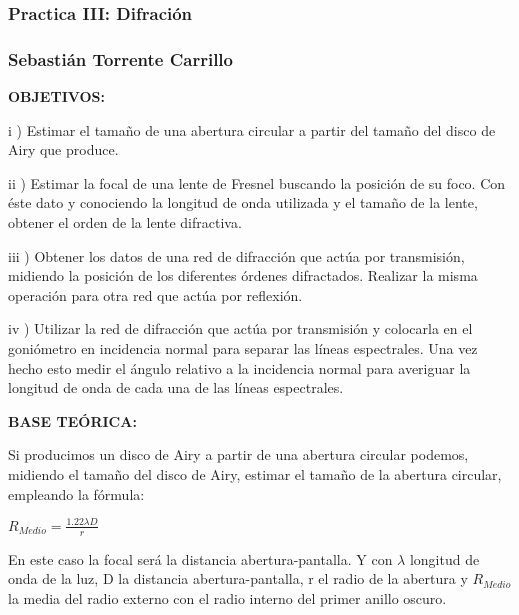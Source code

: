 \documentclass[12pt,thmsa]{article}
\begin{document}
\subsubsection{Practica III: Difraci\'{o}n}

\subsubsection{Sebasti\'{a}n Torrente Carrillo}

\vspace{1pt}

\textbf{OBJETIVOS:}

\vspace{1pt}

i ) Estimar el tama\~{n}o de una abertura circular a partir del tama\~{n}o
del disco de Airy que produce.

ii ) Estimar la focal de una lente de Fresnel buscando la posici\'{o}n de su
foco. Con \'{e}ste dato y conociendo la longitud de onda utilizada y el
tama\~{n}o de la lente, obtener el orden de la lente difractiva.

iii ) Obtener los datos de una red de difracci\'{o}n que act\'{u}a por
transmisi\'{o}n, midiendo la posici\'{o}n de los diferentes \'{o}rdenes
difractados. Realizar la misma operaci\'{o}n para otra red que act\'{u}a por
reflexi\'{o}n.

iv ) Utilizar la red de difracci\'{o}n que act\'{u}a por transmisi\'{o}n y
colocarla en el goni\'{o}metro en incidencia normal para separar las
l\'{i}neas espectrales. Una vez hecho esto medir el \'{a}ngulo relativo a la
incidencia normal para averiguar la longitud de onda de cada una de las
l\'{i}neas espectrales.

\vspace{1pt}

\textbf{BASE TE\'{O}RICA:}

\vspace{1pt}

Si producimos un disco de Airy a partir de una abertura circular podemos,
midiendo el tama\~{n}o del disco de Airy, estimar el tama\~{n}o de la
abertura circular, empleando la f\'{o}rmula:

$R_{Medio}=\frac{1.22\lambda D}{r}$

En este caso la focal ser\'{a} la distancia abertura-pantalla.\vspace{1pt} Y
con $\lambda $ longitud de onda de la luz, D la distancia abertura-pantalla,
r el radio de la abertura y $R_{Medio}$ la media del radio externo con el
radio interno del primer anillo oscuro.
\end{document}
